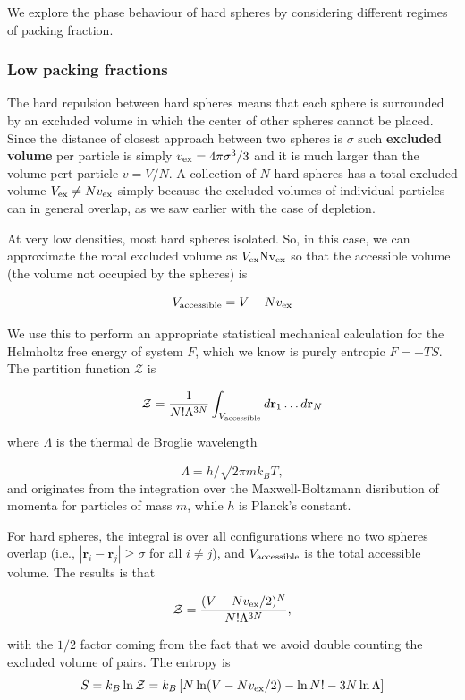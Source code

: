 \documentclass[
  letterpaper,
  enabledeprecatedfontcommands]{report}
\begin{document}
We explore the phase behaviour of hard spheres by considering different
regimes of packing fraction.

\subsubsection*{Low packing fractions}\label{low-packing-fractions}

The hard repulsion between hard spheres means that each sphere is
surrounded by an excluded volume in which the center of other spheres
cannot be placed. Since the distance of closest approach between two
spheres is \(\sigma\) such \textbf{excluded volume} per particle is
simply \(v_{\rm ex} =4\pi\sigma^3/3\) and it is much larger than the
volume pert particle \(v= V/N\). A collection of \(N\) hard spheres has
a total excluded volume \(V_{\rm ex}\neq N v_{\rm ex}\) simply because
the excluded volumes of individual particles can in general overlap, as
we saw earlier with the case of depletion.

At very low densities, most hard spheres isolated. So, in this case, we
can approximate the roral excluded volume as
\(V_{\rm ex} \rm N v_{\rm ex}\) so that the accessible volume (the
volume not occupied by the spheres) is

\[V_{\rm accessible} = V-Nv_{\rm ex}\]

We use this to perform an appropriate statistical mechanical calculation
for the Helmholtz free energy of system \(F\), which we know is purely
entropic \(F=-TS\). The partition function \(\mathcal{Z}\) is

\[
\mathcal{Z} = \frac{1}{N! \Lambda^{3N}} \int_{V_{\rm accessible}} d\mathbf{r}_1 \ldots d\mathbf{r}_N
\]

where \(\Lambda\) is the thermal de Broglie wavelength

\[\Lambda = h/\sqrt{2\pi mk_B T},\] and originates from the integration
over the Maxwell-Boltzmann disribution of momenta for particles of mass
\(m\), while \(h\) is Planck's constant.

For hard spheres, the integral is over all configurations where no two
spheres overlap (i.e., \(|\mathbf{r}_i - \mathbf{r}_j| \geq \sigma\) for
all \(i \neq j\)), and \(V_{\rm accessible}\) is the total accessible
volume. The results is that

\[\mathcal{Z} = \dfrac{(V-Nv_{\rm ex}/2)^N}{N!\Lambda^{3N}},\]

with the \(1/2\) factor coming from the fact that we avoid double
counting the excluded volume of pairs. The entropy is \[
S = k_B \ln \mathcal{Z} = k_B \left[ N \ln(V - N v_{\rm ex}/2) - \ln N! - 3N \ln \Lambda \right]
\]
\end{document}
